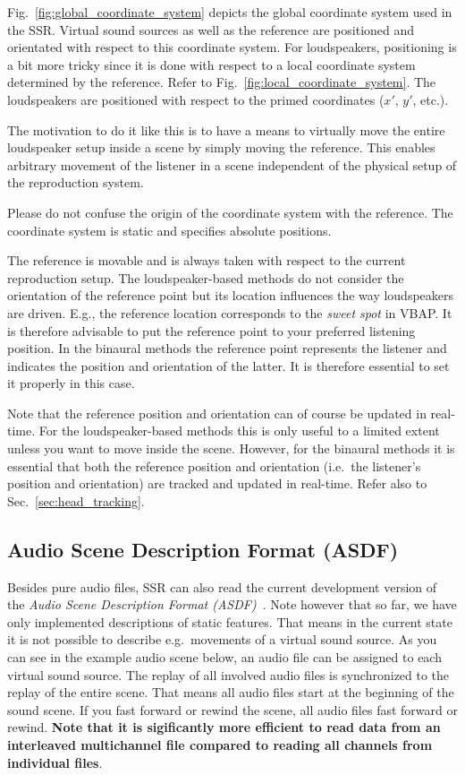 Fig.~\ref{fig:global_coordinate_system} depicts the global coordinate system
used in the SSR. Virtual sound sources as well as the reference are positioned
and orientated with respect to this coordinate system. For loudspeakers,
positioning is a bit more tricky since it is done with respect to a local
coordinate system determined by the reference. Refer to 
Fig.~\ref{fig:local_coordinate_system}. The loudspeakers are positioned with 
respect to the primed coordinates ($x'$, $y'$, etc.).

The motivation to do it like this is to have a means to virtually move the
entire loudspeaker setup inside a scene by simply moving the reference. This
enables arbitrary movement of the listener in a scene independent of the
physical setup of the reproduction system.

Please do not confuse the origin of the coordinate system with the reference. 
The coordinate system is static and specifies absolute positions.

The reference is movable and is always taken with respect to the current 
reproduction setup. The loudspeaker-based methods do not
consider the orientation of the reference point but its location influences the
way loudspeakers are driven. E.g., the reference location corresponds to the
\emph{sweet spot} in VBAP. It is therefore advisable to put the reference point
to your preferred listening position. In the binaural methods
the reference point represents the listener and indicates the position and 
orientation of the latter. It is therefore essential to set it properly in this
case.

Note that the reference position and orientation can of course be updated in
real-time. For the loudspeaker-based methods this is only useful to a limited
extent unless you want to move inside the scene. However, for the binaural 
methods it is essential that both the reference position and orientation 
(i.e.\ the listener's position and orientation) are tracked and updated in 
real-time. Refer also to Sec.~\ref{sec:head_tracking}.

\subsection{Audio Scene Description Format (ASDF)}
\label{sec:asdf}

Besides pure audio files, SSR can also read the current development version of
the \emph{Audio Scene Description Format
(ASDF)}~\cite{Geier08:DAGA}. Note however that so
far, we have only implemented descriptions of static features. That
means in the current state it is not possible to describe
e.g.~movements of a virtual sound source. As
you can see in the example audio scene below, an audio file can be
assigned to each virtual sound source. The replay of all involved
audio files is synchronized to the replay of the entire scene. That
means all audio files start at the beginning of the sound scene. If
you fast forward or rewind the scene, all audio files fast forward
or rewind. {\bf Note that it is sigificantly more efficient to read data from
an interleaved multichannel file compared to reading all channels from
individual files}.

